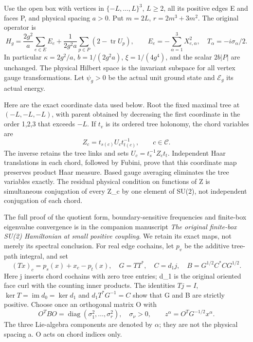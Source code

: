 \documentclass[
  11pt,
]{article}
\begin{document}
Use the open box with vertices in \(\{-L,\ldots,L\}^3\), \(L\ge2\), all
its positive edges E and faces P, and physical spacing \(a>0\). Put
\(m=2L\), \(r=2m^3+3m^2\). The original operator is \[
 H_g=\frac{2g^2}{a}\sum_{e\in E}E_e+
       \frac1{2g^2a}\sum_{p\in P}(2-\operatorname{tr}U_p),
 \qquad E_e=-\sum_{\alpha=1}^3X_{e,\alpha}^2,
 \quad T_\alpha=-i\sigma_\alpha/2.                       \tag{1}
\] In particular \(\kappa=2g^2/a\), \(b=1/(2g^2a)\), \(\xi=1/(4g^4)\),
and the scalar \(2b|P|\) are unchanged. The physical Hilbert space is
the invariant subspace for all vertex gauge transformations. Let
\(\psi_g>0\) be the actual unit ground state and \(\mathcal E_g\) its
actual energy.

Here are the exact coordinate data used below. Root the fixed maximal
tree at \((-L,-L,-L)\), with parent obtained by decreasing the first
coordinate in the order 1,2,3 that exceeds \(-L\). If \(t_v\) is its
ordered tree holonomy, the chord variables are \[
 Z_c=t_{s(c)}U_ct_{t(c)}^{-1},\qquad c\in\mathcal C.       \tag{2}
\] The inverse retains the tree links and sets \(U_c=t_s^{-1}Z_ct_t\).
Independent Haar translations in each chord, followed by Fubini, prove
that this coordinate map preserves product Haar measure. Based gauge
averaging eliminates the tree variables exactly. The residual physical
condition on functions of Z is simultaneous conjugation of every Z\_c by
one element of SU(2), not independent conjugation of each chord.

The full proof of the quotient form, boundary-sensitive frequencies and
finite-box eigenvalue convergence is in the companion manuscript
\emph{The original finite-box SU(2) Hamiltonian at small positive
coupling}. We retain its exact maps, not merely its spectral conclusion.
For real edge cochains, let \(p_v\) be the additive tree-path integral,
and set \[
 (Tx)_c=p_s(x)+x_c-p_t(x),\quad G=TT^*,\quad C=d_1j,
 \quad B=G^{1/2}C^*CG^{1/2}.                              \tag{3}
\] Here j inserts chord cochains with zero tree entries; d\_1 is the
original oriented face curl with the counting inner products. The
identities \(Tj=I\), \(\ker T=\operatorname{im}d_0=\ker d_1\) and
\(d_1T^*G^{-1}=C\) show that G and B are strictly positive. Choose once
an orthogonal matrix O with \[
 O^TBO=\operatorname{diag}(\sigma_1^2,\ldots,\sigma_r^2),
 \quad \sigma_\nu>0,
 \qquad z^\alpha=O^TG^{-1/2}x^\alpha.                     \tag{4}
\] The three Lie-algebra components are denoted by \(\alpha\); they are
not the physical spacing a. O acts on chord indices only.
\end{document}
